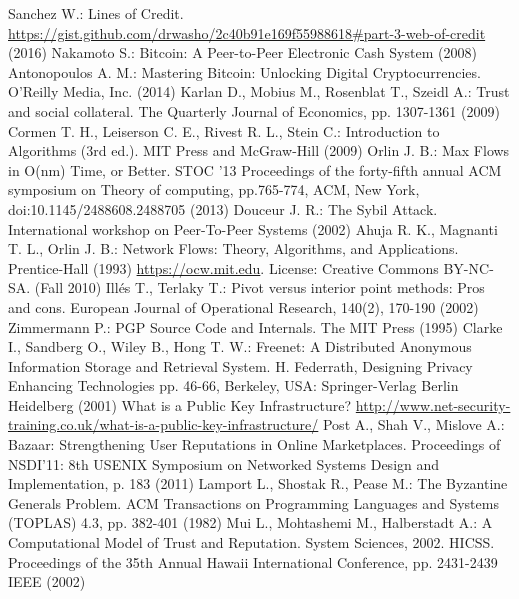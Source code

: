 \begin{thebibliography}{40}
   Sanchez W.: Lines of Credit. \url{https://gist.github.com/drwasho/2c40b91e169f55988618#part-3-web-of-credit} (2016)
   Nakamoto S.: Bitcoin: A Peer-to-Peer Electronic Cash System (2008)
   Antonopoulos A. M.: Mastering Bitcoin: Unlocking Digital Cryptocurrencies. O'Reilly Media, Inc. (2014)
   Karlan D., Mobius M., Rosenblat T., Szeidl A.: Trust and social collateral. The Quarterly Journal of Economics, pp.
   1307-1361 (2009)
   Cormen T. H., Leiserson C. E., Rivest R. L., Stein C.: Introduction to Algorithms (3rd ed.). MIT Press and McGraw-Hill
   (2009)
   Orlin J. B.: Max Flows in O(nm) Time, or Better. STOC '13 Proceedings of the forty-fifth annual ACM symposium on Theory
   of computing, pp.765-774, ACM, New York, doi:10.1145/2488608.2488705 (2013)
   Douceur J. R.: The Sybil Attack. International workshop on Peer-To-Peer Systems (2002)
   Ahuja R. K., Magnanti T. L., Orlin J. B.: Network Flows: Theory, Algorithms, and Applications. Prentice-Hall (1993)
   \url{https://ocw.mit.edu}. License: Creative Commons BY-NC-SA. (Fall 2010)
   Ill\'es T., Terlaky T.: Pivot versus interior point methods: Pros and cons. European Journal of Operational Research,
   140(2), 170-190 (2002)
   Zimmermann P.: PGP Source Code and Internals. The MIT Press (1995)
   Clarke I., Sandberg O., Wiley B., Hong T. W.: Freenet: A Distributed Anonymous Information Storage and
   Retrieval System. H. Federrath, Designing Privacy Enhancing Technologies pp. 46-66, Berkeley, USA: Springer-Verlag
   Berlin Heidelberg (2001)
   What is a Public Key Infrastructure? \url{http://www.net-security-training.co.uk/what-is-a-public-key-infrastructure/}
   Post A., Shah V., Mislove A.: Bazaar: Strengthening User Reputations in Online Marketplaces. Proceedings of NSDI'11:
   8th USENIX Symposium on Networked Systems Design and Implementation, p. 183 (2011)
   Lamport L., Shostak R., Pease M.: The Byzantine Generals Problem. ACM Transactions on Programming Languages and Systems
   (TOPLAS) 4.3, pp. 382-401 (1982)
   Mui L., Mohtashemi M., Halberstadt A.: A Computational Model of Trust and Reputation. System Sciences, 2002. HICSS.
   Proceedings of the 35th Annual Hawaii International Conference, pp. 2431-2439 IEEE (2002)

\end{thebibliography}
